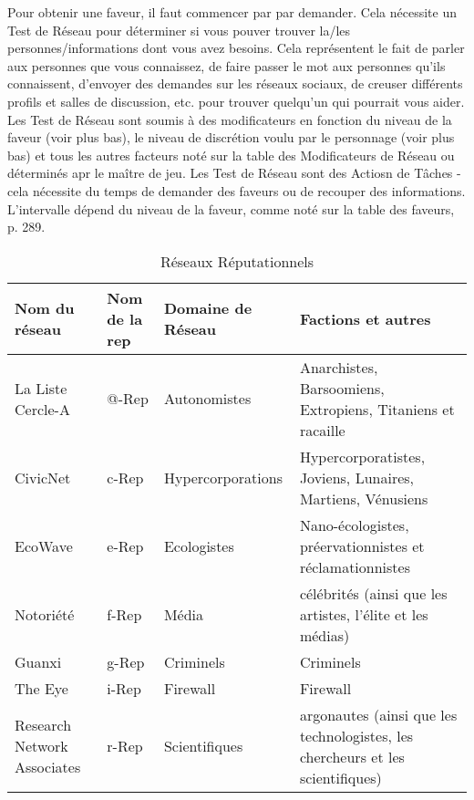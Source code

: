 Pour obtenir une faveur, il faut commencer par par demander. Cela nécessite un Test de Réseau pour déterminer si vous pouver trouver la/les personnes/informations dont vous avez besoins. Cela représentent le fait de parler aux personnes que vous connaissez, de faire passer le mot aux personnes qu'ils connaissent, d'envoyer des demandes sur les réseaux sociaux, de creuser différents profils et salles de discussion, etc. pour trouver quelqu'un qui pourrait vous aider. Les Test de Réseau sont soumis à des modificateurs en fonction du niveau de la faveur (voir plus bas), le niveau de discrétion voulu par le personnage (voir plus bas) et tous les autres facteurs noté sur la table des Modificateurs de Réseau ou déterminés apr le maître de jeu. Les Test de Réseau sont des Actiosn de Tâches - cela nécessite du temps de demander des faveurs ou de recouper des informations. L'intervalle dépend du niveau de la faveur, comme noté sur la table des faveurs, p. 289. 



\begin{table}
   \caption{Réseaux Réputationnels}
   \begin{tabularx}{\textwidth}{|X|l|l|X|} \hline
Nom du réseau &Nom de la rep &Domaine de Réseau &Factions et autres \\ \hline

La Liste Cercle-A &@-Rep &Autonomistes &Anarchistes, Barsoomiens, Extropiens, Titaniens et racaille \\ \hline

CivicNet &c-Rep &Hypercorporations &Hypercorporatistes, Joviens, Lunaires, Martiens, Vénusiens \\ \hline

EcoWave &e-Rep &Ecologistes &Nano-écologistes, préervationnistes et réclamationnistes \\ \hline

Notoriété &f-Rep &Média &célébrités (ainsi que les artistes, l'élite et les médias) \\ \hline

Guanxi &g-Rep &Criminels &Criminels \\ \hline

The Eye &i-Rep &Firewall &Firewall \\ \hline

Research Network Associates &r-Rep &Scientifiques &argonautes (ainsi que les technologistes, les chercheurs et les scientifiques) \\ \hline

   \end{tabularx}
\end{table} 

